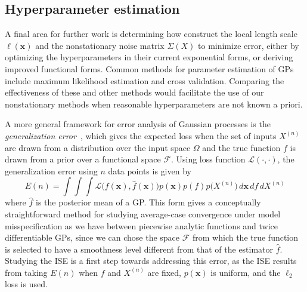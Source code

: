 \documentclass{article}
\renewcommand{\vec}[1]{\mathbf{#1}}
\begin{document}
\subsection{Hyperparameter estimation}
A final area for further work is determining how construct the local length scale $\ell(\vec{x})$ and the nonstationary noise matrix $\Sigma(X)$ to minimize error, either by optimizing the hyperparameters in their current exponential forms, or deriving improved functional forms. Common methods for parameter estimation of GPs include maximum likelihood estimation and cross validation. Comparing the effectiveness of these and other methods would facilitate the use of our nonstationary methods when reasonable hyperparameters are not known a priori.

A more general framework for error analysis of Gaussian processes is the \textit{generalization error}~\cite{rasmussen2003gaussian}, which gives the expected loss when the set of inputs $X^{(n)}$ are drawn from a distribution over the input space $\Omega$ and the true function $f$ is drawn from a prior over a functional space $\mathcal{F}$. Using loss function $\mathcal{L}(\cdot, \cdot)$, the generalization error using $n$ data points is given by
$$ E(n) = \int \int \int \mathcal{L}\Big(f(\vec{x}), \hat{f}(\vec{x})\Big) p(\vec{x}) p(f) p\big(X^{(n)}\big) \, d\vec{x} \, df \,  dX^{(n)}$$
where $\hat{f}$ is the posterior mean of a GP. This form gives a conceptually straightforward method for studying average-case convergence under model misspecification as we have between piecewise analytic functions and twice differentiable GPs, since we can chose the space $\mathcal{F}$ from which the true function is selected to have a smoothness level different from that of the estimator $\hat{f}$. Studying the ISE is a first step towards addressing this error, as the ISE results from taking $E(n)$ when $f$ and $X^{(n)}$ are fixed, $p(\vec{x})$ is uniform, and the $\ell_2$ loss is used.

\newpage

{}

\end{document}
